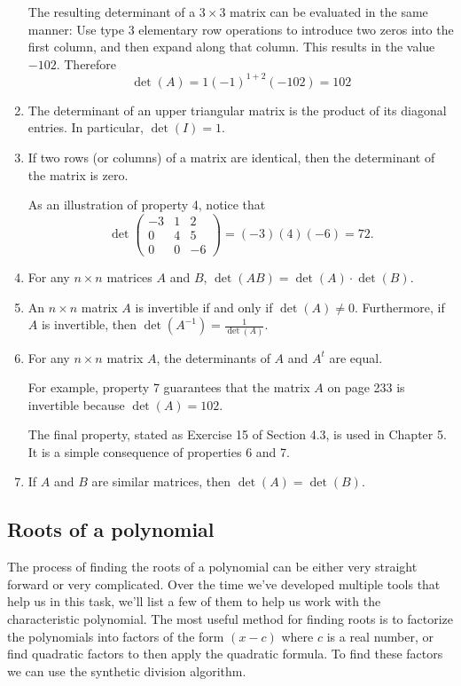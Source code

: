 \documentclass{report}
\begin{document}
\begin{enumerate}
        The resulting determinant of a $3 \times 3$ matrix can be evaluated in the same manner: Use type 3 elementary row operations to introduce two zeros into the first column, and then expand along that column. This results in the value $-102$. Therefore
        $$
        \operatorname{det}(A)=1(-1)^{1+2}(-102)=102
        $$

        \item The determinant of an upper triangular matrix is the product of its diagonal entries. In particular, $\operatorname{det}(I)=1$.

        \item If two rows (or columns) of a matrix are identical, then the determinant of the matrix is zero.

        As an illustration of property 4, notice that
        $$
        \operatorname{det}\left(\begin{array}{rrr}
        -3 & 1 & 2 \\
        0 & 4 & 5 \\
        0 & 0 & -6
        \end{array}\right)=(-3)(4)(-6)=72.
        $$

        \item For any $n \times n$ matrices $A$ and $B$, $\operatorname{det}(A B)=\operatorname{det}(A) \cdot \operatorname{det}(B)$.

        \item An $n \times n$ matrix $A$ is invertible if and only if $\operatorname{det}(A) \neq 0$. Furthermore, if $A$ is invertible, then $\operatorname{det}\left(A^{-1}\right)=\frac{1}{\operatorname{det}(A)}$.

        \item For any $n \times n$ matrix $A$, the determinants of $A$ and $A^{t}$ are equal.

        For example, property 7 guarantees that the matrix $A$ on page 233 is invertible because $\operatorname{det}(A)=102$.

        The final property, stated as Exercise 15 of Section 4.3, is used in Chapter 5. It is a simple consequence of properties 6 and 7.

        \item If $A$ and $B$ are similar matrices, then $\operatorname{det}(A)=\operatorname{det}(B)$.
    \end{enumerate}


    \subsection*{Roots of a polynomial}
    The process of finding the roots of a polynomial can be either very straight forward or very complicated. Over the time we've developed multiple tools that help us in this task, we'll list a few of them to help us work with the characteristic polynomial. The most useful method for finding roots is to factorize the polynomials into factors of the form $(x - c)$ where $c$ is a real number, or find quadratic factors to then apply the quadratic formula. To find these factors we can use the synthetic division algorithm.
\end{document}
